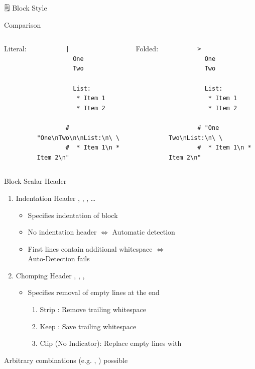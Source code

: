 \documentclass{beamer}
\newcommand{\code}[1]{
  \codebox{\texttt|#1|}
}
\begin{document}
\begin{frame}{🗒 Block Style}
\begin{block}{Comparison}
\begin{columns}
      Literal:\\[0.2cm]
      \begin{verbatim}
        |
          One
          Two

          List:
           * Item 1
           * Item 2

        # "One\nTwo\n\nList:\n\ \
        #  * Item 1\n * Item 2\n"
      \end{verbatim}

      Folded:\\[0.2cm]
      \begin{verbatim}
        >
          One
          Two

          List:
           * Item 1
           * Item 2

        # "One Two\nList:\n\ \
        #  * Item 1\n * Item 2\n"
      \end{verbatim}

    \end{columns}
  \end{block}
  \hspace{0pt}
  \vfill

  \newpage
  \begin{block}{Block Scalar Header}
    \begin{enumerate}
      \item Indentation Header , \code{>2}, \code{>5}, …
      \begin{itemize}
        \item Specifies indentation of block
        \item No indentation header $⇔$ Automatic detection
        \item First lines contain additional whitespace $⇔$ \\
              \alert{Auto-Detection fails}
      \end{itemize}
      \item Chomping Header \codebox{\texttt{|-}}, \codebox{\texttt{|+}}, \code{>-}, \code{>+}
      \begin{itemize}
        \item Specifies removal of empty lines \alert{at the end}
        \begin{enumerate}
          \item Strip \code{-}: Remove trailing whitespace
          \item Keep \code{+}: Save trailing whitespace
          \item Clip (No Indicator): Replace empty lines with \code{\n}
        \end{enumerate}
      \end{itemize}
    \end{enumerate}
    Arbitrary combinations (e.g. , \code{>4+}) possible
  \end{block}

\end{frame}
\end{document}
